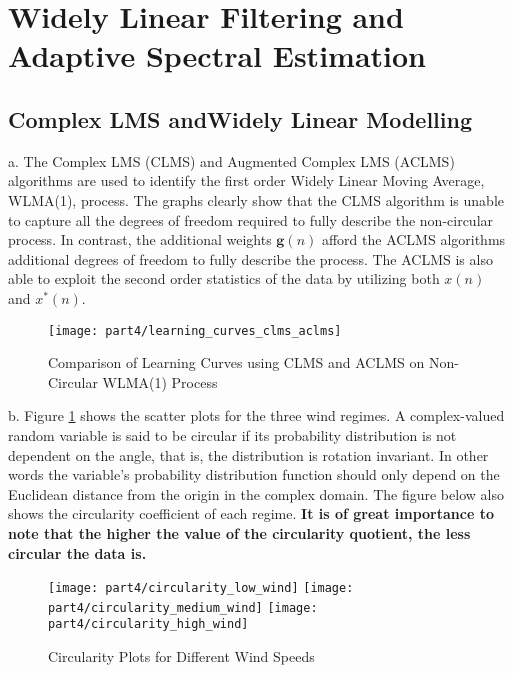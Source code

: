 \section{Widely Linear Filtering and Adaptive Spectral Estimation}

\subsection{Complex LMS andWidely Linear Modelling}
\noindent{}a. The Complex LMS (CLMS) and Augmented Complex LMS (ACLMS) algorithms are used to identify the first order Widely Linear Moving Average, WLMA(1), process. The graphs clearly show that the CLMS algorithm is unable to capture all the degrees of freedom required to fully describe the non-circular process. In contrast, the additional weights $\textbf{g}(n)$ afford the ACLMS algorithms additional degrees of freedom to fully describe the process. The ACLMS is also able to exploit the second order statistics of the data by utilizing both $x(n)$ and $x^*(n)$.

\begin{figure}[H]
\centering{}
\texttt{[image: part4/learning\_curves\_clms\_aclms]}
\caption{Comparison of Learning Curves using CLMS and ACLMS on Non-Circular WLMA(1) Process}
\end{figure}

\noindent{}b. Figure \ref{fig:wind_circularity} shows the scatter plots for the three wind regimes. A complex-valued random variable is said to be circular if its probability distribution is not dependent on the angle, that is, the distribution is rotation invariant. In other words the variable's probability distribution function should only depend on the Euclidean distance from the origin in the complex domain. The figure below also shows the circularity coefficient of each regime.\textbf{ It is of great importance to note that the higher the value of the circularity quotient, the less circular the data is.}

\begin{figure}[H]
\centering{}
\texttt{[image: part4/circularity\_low\_wind]}
\texttt{[image: part4/circularity\_medium\_wind]}
\texttt{[image: part4/circularity\_high\_wind]}
\caption{Circularity Plots for Different Wind Speeds}
\label{fig:wind_circularity}
\end{figure}


